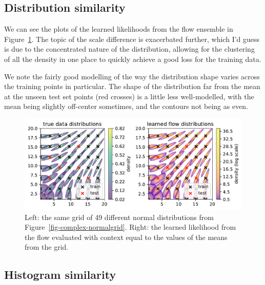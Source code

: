 \documentclass[
  11pt,
  numbers=noendperiod]{book}
\begin{document}
\hypertarget{distribution-similarity-1}{%
\subsection{Distribution similarity}\label{distribution-similarity-1}}

We can see the plots of the learned likelihoods from the flow ensemble
in Figure~\ref{fig-complex-lhoods}. The topic of the scale difference is
exacerbated further, which I'd guess is due to the concentrated nature
of the distribution, allowing for the clustering of all the density in
one place to quickly achieve a good loss for the training data.

We note the fairly good modelling of the way the distribution shape
varies across the training points in particular. The shape of the
distribution far from the mean at the unseen test set points (red
crosses) is a little less well-modelled, with the mean being slightly
off-center sometimes, and the contours not being as even.

\begin{figure}

{\centering \includegraphics{./images/flows/complex/non-simpleflowvsdata.pdf}

}

\caption{\label{fig-complex-lhoods}Left: the same grid of 49 different
normal distributions from Figure~\ref{fig-complex-normalgrid}. Right:
the learned likelihood from the flow evaluated with context equal to the
values of the means from the grid.}

\end{figure}

\hypertarget{histogram-similarity-1}{%
\subsection{Histogram similarity}\label{histogram-similarity-1}}
\end{document}
